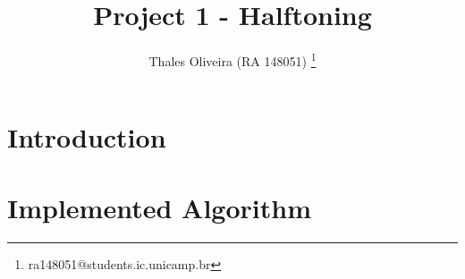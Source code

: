 \documentclass[]{IEEEtran}
\begin{document}
  \title{Project 1 - Halftoning}
  \author{Thales Oliveira (RA 148051)
    \thanks{ra148051@students.ic.unicamp.br}
  }
  \maketitle
  
  \begin{abstract}

  \end{abstract}
  
\section{Introduction} 

\section{Implemented Algorithm}
 




\end{document}
